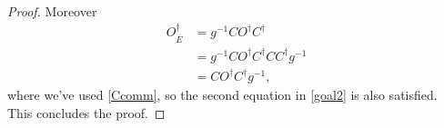 \documentclass[12pt]{article}
\newcommand{\ol}{\overline}
\begin{document}
\begin{proof}
Moreover
\begin{align}\nonumber
O_{\ol{E}}^\dagger&=g^{-1}C O^\dagger C^\dagger\\\nonumber
&=g^{-1}C O^\dagger C^\dagger C C^\dagger g^{-1}\\
&=C O^\dagger C^\dagger g^{-1},
\end{align}
where we've used \eqref{Ccomm}, so the second equation in \eqref{goal2} is also satisfied.  This concludes the proof.
\end{proof}



\end{document}
